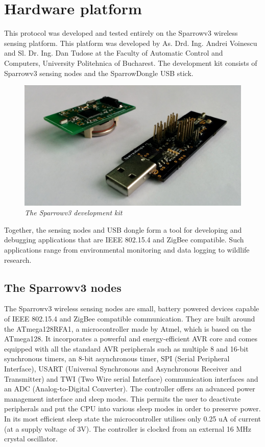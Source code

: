 
\chapter{Hardware platform}

This protocol was developed and tested entirely on the Sparrowv3 wireless
sensing platform. This platform was developed by As. Drd. Ing. Andrei Voinescu
and Sl. Dr. Ing. Dan Tudose at the Faculty of Automatic Control and Computers,
University Politehnica of Bucharest. The development kit consists of Sparrowv3
sensing nodes and the SparrowDongle USB stick.

\begin{figure}[ht]
	\begin{center}
		\includegraphics[width=\textwidth]{img/sparrowv3_kit.jpg}
	\end{center}
	\caption{\small \itshape{The Sparrowv3 development kit}}
\end{figure}

Together, the sensing nodes and USB dongle form a tool for developing and
debugging applications that are IEEE 802.15.4 and ZigBee compatible. Such
applications range from environmental monitoring and data logging to wildlife
research.

\section{The Sparrowv3 nodes}

The Sparrowv3 wireless sensing nodes are small, battery powered devices capable
of IEEE 802.15.4 and ZigBee compatible communication. They are built around the
\mbox{ATmega128RFA1}, a microcontroller made by Atmel, which is based on the
\mbox{ATmega128}. It incorporates a powerful and energy-efficient AVR core and
comes equipped with all the standard AVR peripherals such as multiple 8 and
16-bit synchronous timers, an 8-bit asynchronous timer, SPI (Serial Peripheral
Interface), USART (Universal Synchronous and Asynchronous Receiver and
Transmitter) and TWI (Two Wire serial Interface) communication interfaces and
an ADC (Analog-to-Digital Converter). The controller offers an advanced power
management interface and sleep modes. This permits the user to deactivate
peripherals and put the CPU into various sleep modes in order to preserve
power. In its most efficient sleep state the microcontroller utilises only 0.25
uA of current (at a supply voltage of 3V). The controller is clocked from an
external 16 MHz crystal oscillator.

